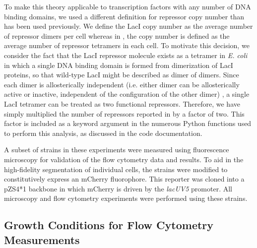 To make this theory applicable to transcription factors with any number of DNA
binding domains, we used a different definition for repressor copy number than
has been used previously. We define the LacI copy number as the average number
of repressor dimers per cell whereas in \textcite{Garcia2011}, the copy number is
defined as the average number of repressor tetramers in each cell. To motivate
this decision, we consider the fact that the LacI repressor molecule exists as a
tetramer in \textit{E. coli} \citep{Lewis1996} in which a single DNA binding
domain is formed from dimerization of LacI proteins, so that wild-type LacI
might be described as dimer of dimers. Since each dimer is allosterically
independent (i.e. either dimer can be allosterically active or inactive,
independent of the configuration of the other dimer) \citep{Daber2009}, a single
LacI tetramer can be treated as two functional repressors. Therefore, we have
simply multiplied the number of repressors reported in \textcite{Garcia2011} by a
factor of two. This factor is included as a keyword argument in the numerous
Python functions used to perform this analysis, as discussed in the code
documentation.

A subset of strains in these experiments were measured using fluorescence
microscopy for validation of the flow cytometry data and results. To aid in the
high-fidelity segmentation of individual cells, the strains were modified to
constitutively express an mCherry fluorophore. This reporter was cloned into a
pZS4*1 backbone \citep{Lutz1997} in which mCherry is driven by the
\textit{lacUV5} promoter. All microscopy and flow cytometry experiments were
performed using these strains.

\subsection*{Growth Conditions for Flow Cytometry Measurements}

